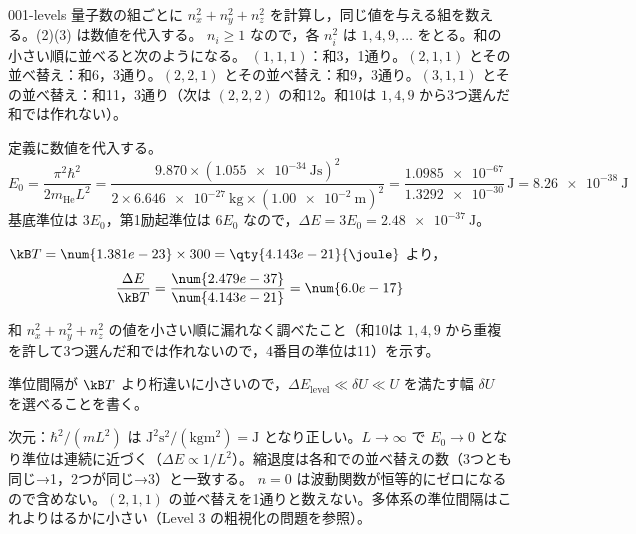 \documentclass[uplatex,dvipdfmx,a4paper,11pt]{jsarticle}
\begin{document}
\kaitouhen
{}
\begin{kaisetsu}{001-levels}
\houshin 量子数の組ごとに $n_{x}^{2}+n_{y}^{2}+n_{z}^{2}$ を計算し，同じ値を与える組を数える。(2)(3) は数値を代入する。
\keisan
{} $n_{i}\ge1$ なので，各 $n_{i}^{2}$ は $1,4,9,\dots$ をとる。和の小さい順に並べると次のようになる。
$(1,1,1)$：和3，1通り。$(2,1,1)$ とその並べ替え：和6，3通り。$(2,2,1)$ とその並べ替え：和9，3通り。$(3,1,1)$ とその並べ替え：和11，3通り（次は $(2,2,2)$ の和12。和10は $1,4,9$ から3つ選んだ和では作れない）。

 定義に数値を代入する。
\[E_{0}=\frac{\pi^{2}\hbar^{2}}{2m_{\mathrm{He}}L^{2}}=\frac{\num{9.870}\times(\qty{1.055e-34}{\joule\second})^{2}}{2\times\qty{6.646e-27}{\kilogram}\times(\qty{1.00e-2}{\metre})^{2}}=\frac{\num{1.0985e-67}}{\num{1.3292e-30}}\,\unit{\joule}=\qty{8.26e-38}{\joule}\]
基底準位は $3E_{0}$，第1励起準位は $6E_{0}$ なので，$\Delta E=3E_{0}=\qty{2.48e-37}{\joule}$。

 $\kB T=\num{1.381e-23}\times300=\qty{4.143e-21}{\joule}$ より，
\[\frac{\Delta E}{\kB T}=\frac{\num{2.479e-37}}{\num{4.143e-21}}=\num{6.0e-17}\]
\begin{ronten}
  \item {} 和 $n_{x}^{2}+n_{y}^{2}+n_{z}^{2}$ の値を小さい順に漏れなく調べたこと（和10は $1,4,9$ から重複を許して3つ選んだ和では作れないので，4番目の準位は11）を示す。
  \item {} 準位間隔が $\kB T$ より桁違いに小さいので，$\Delta E_{\mathrm{level}}\ll\delta U\ll U$ を満たす幅 $\delta U$ を選べることを書く。
\end{ronten}
\kenzan 次元：$\hbar^{2}/(mL^{2})$ は $\unit{\joule\squared\second\squared}/(\unit{\kilogram\metre\squared})=\unit{\joule}$ となり正しい。$L\to\infty$ で $E_{0}\to0$ となり準位は連続に近づく（$\Delta E\propto1/L^{2}$）。縮退度は各和での並べ替えの数（3つとも同じ→1，2つが同じ→3）と一致する。
\tsumazuki $n=0$ は波動関数が恒等的にゼロになるので含めない。$(2,1,1)$ の並べ替えを1通りと数えない。多体系の準位間隔はこれよりはるかに小さい（Level 3 の粗視化の問題を参照）。
\end{kaisetsu}
\end{document}
